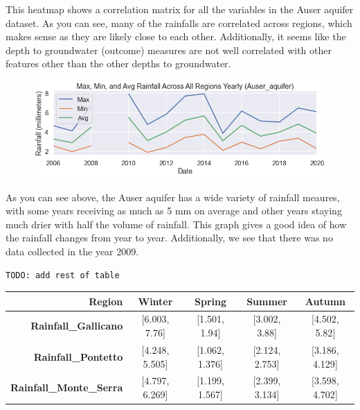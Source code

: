 \documentclass[12pt, letterpaper]{article}
\begin{document}
This heatmap shows a correlation matrix for all the variables in the Auser aquifer dataset. As you can see, many of the rainfalls are correlated across regions, which makes sense as they are likely close to each other. Additionally, it seems like the depth to groundwater (outcome) measures are not well correlated with other features other than the other depths to groundwater.

\begin{figure}[H]
    \includegraphics[width=1\textwidth]{aq_auser_maxminavg.png}
    \centering
\end{figure}

As you can see above, the Auser aquifer has a wide variety of rainfall meaures, with some years receiving as much as 5 mm on average and other years staying much drier with half the volume of rainfall. This graph gives a good idea of how the rainfall changes from year to year. Additionally, we see that there was no data collected in the year 2009. 

\begin{verbatim}
TODO: add rest of table
\end{verbatim}

\begin{table}[H]
    \begin{tabular}{r|cccc}
    \textbf{Region}                 & \textbf{Winter}    & \textbf{Spring}    & \textbf{Summer}    & \textbf{Autumn}    \\ \hline
    \textbf{Rainfall\_Gallicano}    & {[}6.003, 7.76{]}  & {[}1.501, 1.94{]}  & {[}3.002, 3.88{]}  & {[}4.502, 5.82{]}  \\
    \textbf{Rainfall\_Pontetto}     & {[}4.248, 5.505{]} & {[}1.062, 1.376{]} & {[}2.124, 2.753{]} & {[}3.186, 4.129{]} \\
    \textbf{Rainfall\_Monte\_Serra} & {[}4.797, 6.269{]} & {[}1.199, 1.567{]} & {[}2.399, 3.134{]} & {[}3.598, 4.702{]}
    \end{tabular}
    \centering
\end{table}
\end{document}
